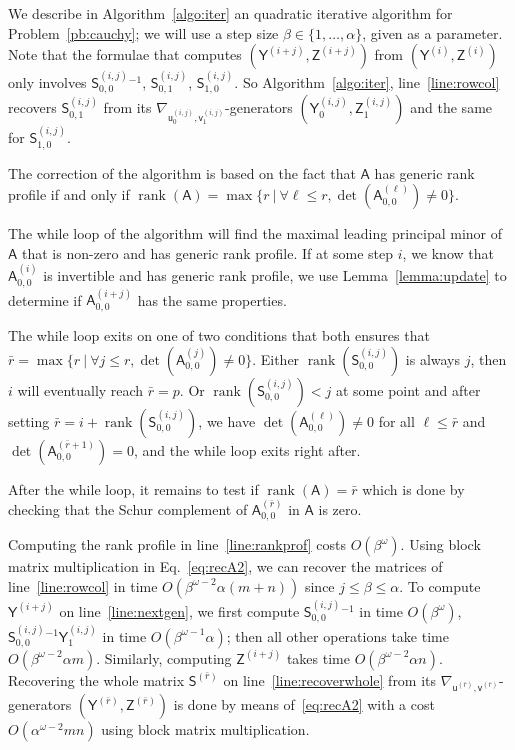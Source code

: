 \documentclass{sig-alternate}
\newcommand{\vu}{\ensuremath{\mathsf{u}}}
\newcommand{\vv}{\ensuremath{\mathsf{v}}}
\newcommand{\mA}{\ensuremath{\mathsf{A}}}
\newcommand{\mS}{\ensuremath{\mathsf{S}}}
\newcommand{\mY}{\ensuremath{\mathsf{Y}}}
\newcommand{\mZ}{\ensuremath{\mathsf{Z}}}
\newcommand{\rank}{\ensuremath{\operatorname{rank}}}
\begin{document}
We describe in Algorithm~\ref{algo:iter} an quadratic iterative
algorithm for Problem~\ref{pb:cauchy}; we will use a step size
$\beta \in \{1,\dots,\alpha\}$, given as a parameter.  Note that the
formulae that computes $(\mY^{(i+j)},\mZ^{(i+j)})$ from
$(\mY^{(i)},\mZ^{(i)})$ only involves $\mS^{(i,j)}_{0,0}{}^{-1}$,
$\mS^{(i,j)}_{0,1}$, $\mS^{(i,j)}_{1,0}$. So
Algorithm~\ref{algo:iter}, line~\ref{line:rowcol} recovers
$\mS^{(i,j)}_{0,1}$ from its
$\nabla_{\vu^{(i,j)}_0, \vv^{(i,j)}_1}$-generators
$(\mY^{(i,j)}_0,\mZ^{(i,j)}_1)$ and the same for $\mS^{(i,j)}_{1,0}$.

\smallskip{}
The correction of the algorithm is based on the fact that $\mA$ has
generic rank profile if and only if
$\rank(\mA) = \max\{ r \ |\  \forall \ell \leq r, \det(\mA^{(\ell)}_{0,0}) \neq
0 \}$.

The while loop of the algorithm will find the maximal leading
principal minor of $\mA$ that is non-zero and has generic rank
profile. If at some step $i$, we know that $\mA^{(i)}_{0,0}$ is
invertible and has generic rank profile, we use
Lemma~\ref{lemma:update} to determine if $\mA^{(i+j)}_{0,0}$ has the
same properties.

The while loop exits on one of two conditions that both ensures that
$\bar{r} = \max\{ r \ |\ \forall j \leq r, \det(\mA^{(j)}_{0,0}) \neq
0 \}$.
Either $\rank(\mS^{(i,j)}_{0,0})$ is always $j$, then $i$ will
eventually reach $\bar{r}=p$. Or $\rank(\mS^{(i,j)}_{0,0})<j$ at some
point and after setting $\bar{r}=i+\rank( \mS^{(i,j)}_{0,0})$, we
have $\det(\mA^{(\ell)}_{0,0}) \neq 0$ for all $\ell \leq \bar{r}$
and $\det(\mA^{(\bar{r}+1)}_{0,0}) = 0$, and the while loop exits
right after.

After the while loop, it remains to test if $\rank(\mA) = \bar{r}$
which is done by checking that the Schur complement of
$\mA^{(\bar{r})}_{0,0}$ in $\mA$ is zero.

\smallskip{} Computing the rank profile
in line~\ref{line:rankprof} costs $O(\beta^\omega)$.  Using block
matrix multiplication in Eq.~\eqref{eq:recA2}, we can recover the
matrices of line~\ref{line:rowcol} in time
$O(\beta^{\omega-2} \alpha (m+n))$ since $j \le \beta \le \alpha$.  To
compute $\mY^{(i+j)}$ on line~\ref{line:nextgen}, we first compute
$\mS^{(i,j)}_{0,0}{}^{-1}$ in time $O(\beta^{\omega})$,
$\mS^{(i,j)}_{0,0}{}^{-1} \mY^{(i,j)}_1$ in time
$O(\beta^{\omega-1} \alpha)$; then all other operations take time
$O(\beta^{\omega-2} \alpha m)$.  Similarly, computing $\mZ^{(i+j)}$
takes time $O(\beta^{\omega-2} \alpha n)$.  Recovering the whole
matrix $\mS^{(\bar{r})}$ on line~\ref{line:recoverwhole} from its
$\nabla_{\vu^{(\bar{r})},\vv^{(\bar{r})}}$-generators
$(\mY^{(\bar{r})},\mZ^{(\bar{r})})$ is done by means
of~\eqref{eq:recA2} with a cost $O(\alpha^{\omega-2} mn)$ using block
matrix multiplication.
\end{document}
